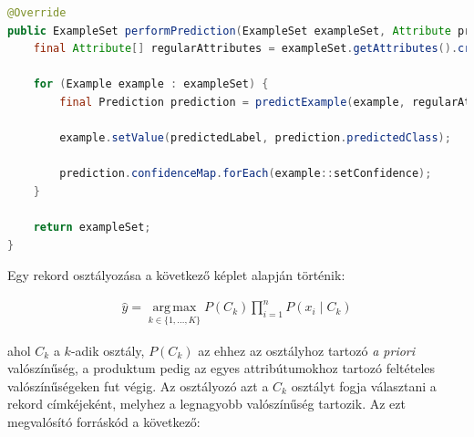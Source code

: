 \documentclass[a4paper]{article}
\DeclareMathOperator*{\argmax}{arg\,max}
\begin{document}
\begin{lstlisting}[language=Java, caption={Adathalmaz rekordjainak osztályozása.}, captionpos=b, escapechar=$]
@Override
public ExampleSet performPrediction(ExampleSet exampleSet, Attribute predictedLabel) {
    final Attribute[] regularAttributes = exampleSet.getAttributes().createRegularAttributeArray();

    for (Example example : exampleSet) {
        final Prediction prediction = predictExample(example, regularAttributes);

        example.setValue(predictedLabel, prediction.predictedClass);

        prediction.confidenceMap.forEach(example::setConfidence);
    }

    return exampleSet;
}
\end{lstlisting}

Egy rekord osztályozása a következő képlet alapján történik:

\begin{align*}
    \hat{y} = \argmax\limits_{k \in \{1, \ldots, K\}} P(C_k) \prod\limits_{i = 1}^{n}P(x_i \; | \; C_k)
\end{align*}

ahol $C_k$ a $k$-adik osztály, $P(C_k)$ az ehhez az osztályhoz tartozó \textit{a priori} valószínűség, a produktum pedig az egyes attribútumokhoz tartozó feltételes valószínűségeken fut végig. Az osztályozó azt a $C_k$ osztályt fogja választani a rekord címkéjeként, melyhez a legnagyobb valószínűség tartozik. Az ezt megvalósító forráskód a következő:
\end{document}

